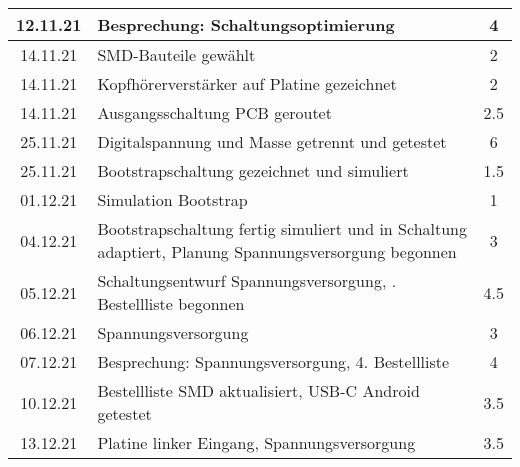 \begin{longtable}{c|p{10cm}|c}
    12.11.21       & Besprechung: Schaltungsoptimierung                                                                            & 4                \\ \hline
    14.11.21       & SMD-Bauteile gewählt                                                                                          & 2                \\ \hline
    14.11.21       & Kopfhörerverstärker auf Platine gezeichnet                                                                    & 2                \\ \hline
    14.11.21       & Ausgangsschaltung PCB geroutet                                                                                & 2.5              \\ \hline
    25.11.21       & Digitalspannung und Masse getrennt und getestet                                                               & 6                \\ \hline
    25.11.21       & Bootstrapschaltung gezeichnet und simuliert                                                                   & 1.5              \\ \hline
    01.12.21       & Simulation Bootstrap                                                                                          & 1                \\ \hline
    04.12.21       & Bootstrapschaltung fertig simuliert und in Schaltung \newline adaptiert, Planung Spannungsversorgung begonnen & 3                \\ \hline
    05.12.21       & Schaltungsentwurf Spannungsversorgung, \newline 4. Bestellliste   begonnen                                    & 4.5              \\ \hline
    06.12.21       & Spannungsversorgung                                                                                           & 3                \\ \hline
    07.12.21       & Besprechung: Spannungsversorgung, 4. Bestellliste                                                             & 4                \\ \hline
    10.12.21       & Bestellliste SMD aktualisiert, USB-C Android getestet                                                         & 3.5              \\ \hline
    13.12.21       & Platine linker Eingang, Spannungsversorgung                                                                   & 3.5              \\ \hline

\end{longtable}
